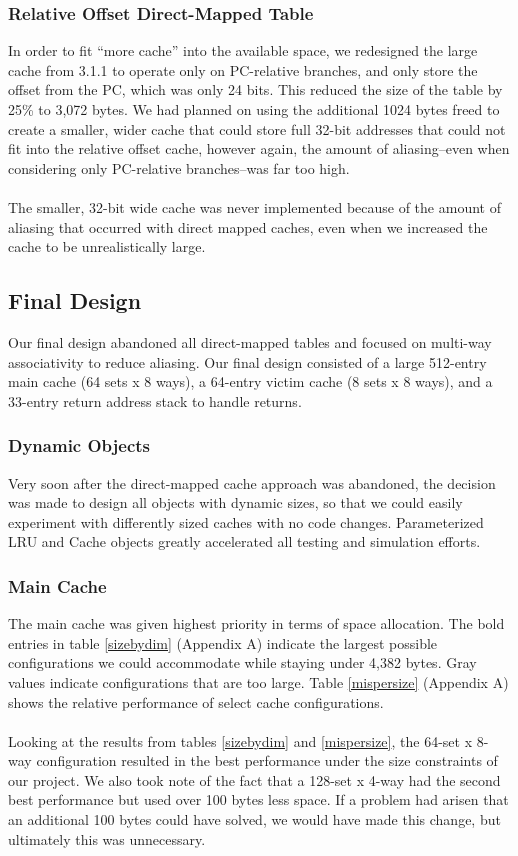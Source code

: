 \documentclass[twocolumn]{article}
\begin{document}
\subsubsection{Relative Offset Direct-Mapped Table}
In order to fit ``more cache'' into the available space, we redesigned the large cache from 3.1.1 to operate only on PC-relative branches, and only store the offset from the PC, which was only 24 bits.  This reduced the size of the table by 25\% to 3,072 bytes.  We had planned on using the additional 1024 bytes freed to create a smaller, wider cache that could store full 32-bit addresses that could not fit into the relative offset cache, however again, the amount of aliasing--even when considering only PC-relative branches--was far too high.\\\\
The smaller, 32-bit wide cache was never implemented because of the amount of aliasing that occurred with direct mapped caches, even when we increased the cache to be unrealistically large. 

\subsection{Final Design}
Our final design abandoned all direct-mapped tables and focused on multi-way associativity to reduce aliasing.  Our final design consisted of a large 512-entry main cache (64 sets x 8 ways), a 64-entry victim cache (8 sets x 8 ways), and a 33-entry return address stack to handle returns. 
\subsubsection{Dynamic Objects}
Very soon after the direct-mapped cache approach was abandoned, the decision was made to design all objects with dynamic sizes, so that we could easily experiment with differently sized caches with no code changes.  Parameterized LRU and Cache objects greatly accelerated all testing and simulation efforts. 
\subsubsection{Main Cache}
The main cache was given highest priority in terms of space allocation.  The bold entries in table \ref{sizebydim} (Appendix A) indicate the largest possible configurations we could accommodate while staying under 4,382 bytes.  Gray values indicate configurations that are too large.  Table \ref{mispersize} (Appendix A) shows the relative performance  of select cache configurations.\\\\
Looking at the results from tables \ref{sizebydim} and \ref{mispersize}, the 64-set x 8-way configuration resulted in the best performance under the size constraints of our project.  We also took note of the fact that a 128-set x 4-way had the second best performance but used over 100 bytes less space.  If a problem had arisen that an additional 100 bytes could have solved, we would have made this change, but ultimately this was unnecessary. 
\end{document}
